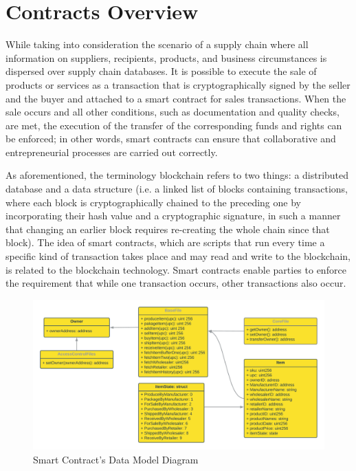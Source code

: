 \section{Contracts Overview}   

While taking into consideration the scenario of a supply chain where all information on suppliers, recipients, products, and business circumstances is dispersed over supply chain databases.
It is possible to execute the sale of products or services as a transaction that is cryptographically signed by the seller and the buyer and attached to a smart contract for sales transactions. When the sale occurs and all other conditions, such as documentation and quality checks, are met, the execution of the transfer of the corresponding funds and rights can be enforced; in other words, smart contracts can ensure that collaborative and entrepreneurial processes are carried out correctly.

\vspace{.5cm}

As aforementioned, the terminology blockchain refers to two things: a distributed database and a data structure (i.e. a linked list of blocks containing transactions, where each block is cryptographically chained to the preceding one by incorporating their hash value and a cryptographic signature, in such a manner that changing an earlier block requires re-creating the whole chain since that block). The idea of smart contracts, which are scripts that run every time a specific kind of transaction takes place and may read and write to the blockchain, is related to the blockchain technology. Smart contracts enable parties to enforce the requirement that while one transaction occurs, other transactions also occur.

    \begin{figure}[h]
    \centering
      \includegraphics[width=15cm]{includes/figures/Data Model diagram.png} 
      \caption{Smart Contract's Data Model Diagram}
      \label{Data Model diagram}
    \end{figure}
    
